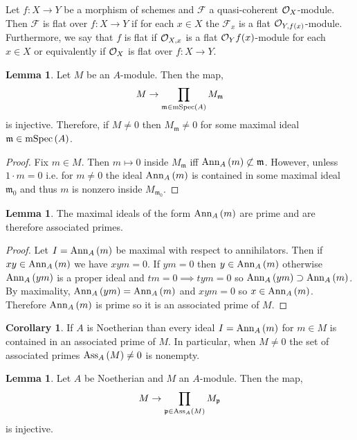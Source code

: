 \documentclass[12pt]{extarticle}
\theoremstyle{definition}
\newtheorem{lemma}[theorem]{Lemma}
\newtheorem{corollary}[theorem]{Corollary}
\newenvironment{definition}[1][Definition:]{\begin{trivlist}
\item[\hskip \labelsep {\bfseries #1}]}{\end{trivlist}}
\newcommand{\F}{\mathcal{F}}
\newcommand{\m}{\mathfrak{m}}
\begin{document}
\begin{definition}
Let $f : X \to Y$ be a morphism of schemes and $\F$ a quasi-coherent $\mathcal{O}_{X}$-module. Then $\F$ is flat over $f : X \to Y$ if for each $x \in X$ the $\F_x$ is a flat $\mathcal{O}_{Y, f(x)}$-module. 
\bigskip\\
Furthermore, we say that $f$ is flat if $\mathcal{O}_{X, x}$ is a flat $\mathcal{O}_{Y}{f(x)}$-module for each $x \in X$ or equivalently if $\mathcal{O}_{X}$ is flat over $f : X \to Y$.
\end{definition}


\begin{lemma}
Let $M$ be an $A$-module. Then the map,
\[ M \to \prod_{\m \in \mSpec{A}} M_\m \]
is injective. Therefore, if $M \neq 0$ then $M_\m \neq 0$ for some maximal ideal $\m \in \mSpec{A}$. 
\end{lemma}

\begin{proof}
Fix $m \in M$. Then $m \mapsto 0$ inside $M_\m$ iff $\Ann{A}{m} \not\subset \m$. However, unless $1 \cdot m = 0$ i.e. for $m \neq 0$ the ideal $\mathrm{Ann}_{A}\left( m \right)$ is contained in some maximal ideal $\m_0$ and thus $m$ is nonzero inside $M_{\m_0}$. 
\end{proof}

\begin{lemma}
The maximal ideals of the form $\mathrm{Ann}_{A}\left( m \right)$ are prime and are therefore associated primes. 
\end{lemma}

\begin{proof}
Let $I = \mathrm{Ann}_{A}\left( m \right)$ be maximal with respect to annihilators. Then if $xy \in \mathrm{Ann}_{A}\left( m \right)$ we have $xym = 0$. If $ym = 0$ then $y \in \mathrm{Ann}_{A}\left( m \right)$ otherwise $\mathrm{Ann}_{A}\left( ym \right)$ is a proper ideal and $tm = 0 \implies tym = 0$ so $\mathrm{Ann}_{A}\left( ym \right) \supset \mathrm{Ann}_{A}\left( m \right)$. By maximality, $\mathrm{Ann}_{A}\left( ym \right) = \mathrm{Ann}_{A}\left( m \right)$ and $xym = 0$ so $x \in \mathrm{Ann}_{A}\left( m \right)$. Therefore $\mathrm{Ann}_{A}\left( m \right)$ is prime so it is an associated prime of $M$.
\end{proof}

\begin{corollary}
If $A$ is Noetherian than every ideal $I = \mathrm{Ann}_{A}\left( m \right)$ for $m \in M$ is contained in an associated prime of $M$. In particular, when $M \neq 0$ the set of associated primes $\mathrm{Ass}_{A} \left( M \right) \neq 0$ is nonempty.
\end{corollary}

\begin{lemma}
Let $A$ be Noetherian and $M$ an $A$-module. Then the map,
\[ M \to \prod_{\mathfrak{p} \in \mathrm{Ass}_{A} \left( M \right)} M_{\mathfrak{p}} \]
is injective. 
\end{lemma}
\end{document}

